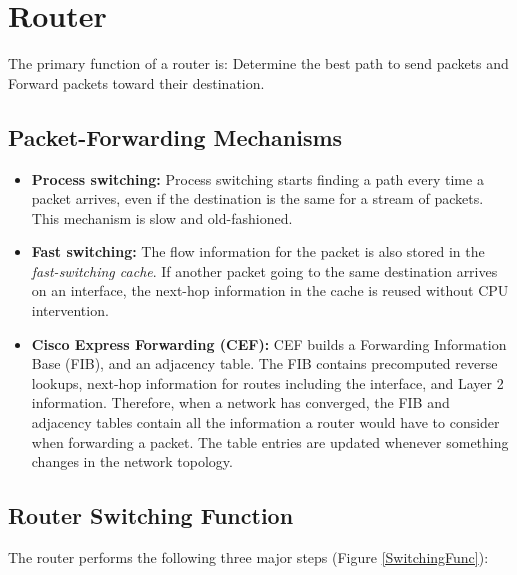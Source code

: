 \chapter{Router}

The primary function of a router is: Determine the best path to send packets and Forward packets toward their destination.

\section{Packet-Forwarding Mechanisms}

\begin{itemize}
\item \textbf{Process switching:} Process switching starts finding a path every time a packet arrives, even if the destination is the same for a stream of packets. This mechanism is slow and old-fashioned.

\item \textbf{Fast switching:} The flow information for the packet is also stored in the \emph{fast-switching cache}. If another packet going to the same destination arrives on an interface, the next-hop information in the cache is reused without CPU intervention.

\item \textbf{Cisco Express Forwarding (CEF):} CEF builds a Forwarding Information Base (FIB), and an adjacency table. The FIB contains precomputed reverse lookups, next-hop information for routes including the interface, and Layer 2 information. Therefore, when a network has converged, the FIB and adjacency tables contain all the information a router would have to consider when forwarding a packet. The table entries are updated whenever something changes in the network topology. 
\end{itemize}

\section{Router Switching Function }

The router performs the following three major steps (Figure \ref{SwitchingFunc}):


